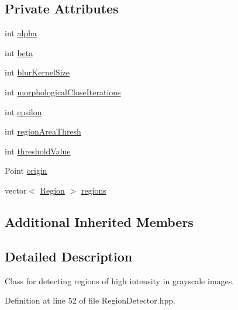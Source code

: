 \subsection*{Private Attributes}
\begin{DoxyCompactItemize}
\item 
int \hyperlink{classmultiscale_1_1analysis_1_1RegionDetector_ab768a3bbfff9835b441a889ab2cb05a6}{alpha}
\item 
int \hyperlink{classmultiscale_1_1analysis_1_1RegionDetector_a23c831170c2264dd7e59067a1a7d3c8e}{beta}
\item 
int \hyperlink{classmultiscale_1_1analysis_1_1RegionDetector_aae6ee0ec7f0a610dd8a906c1eb181bc7}{blur\-Kernel\-Size}
\item 
int \hyperlink{classmultiscale_1_1analysis_1_1RegionDetector_a700a2f299d7c56fbd1fdbec68092f23a}{morphological\-Close\-Iterations}
\item 
int \hyperlink{classmultiscale_1_1analysis_1_1RegionDetector_acf21910fadd7c6ef2810743a78a0aeb9}{epsilon}
\item 
int \hyperlink{classmultiscale_1_1analysis_1_1RegionDetector_a1f637073a3d946d000dceed01412f19a}{region\-Area\-Thresh}
\item 
int \hyperlink{classmultiscale_1_1analysis_1_1RegionDetector_a0f7469d124c0b906d199e00ea5713007}{threshold\-Value}
\item 
Point \hyperlink{classmultiscale_1_1analysis_1_1RegionDetector_a8d2a487b7a4168ba94caa3596efbf794}{origin}
\item 
vector$<$ \hyperlink{classmultiscale_1_1analysis_1_1Region}{Region} $>$ \hyperlink{classmultiscale_1_1analysis_1_1RegionDetector_aa6517ceb3a58295448d32e6e41499893}{regions}
\end{DoxyCompactItemize}
\subsection*{Additional Inherited Members}


\subsection{Detailed Description}
Class for detecting regions of high intensity in grayscale images. 

Definition at line 52 of file Region\-Detector.\-hpp.



